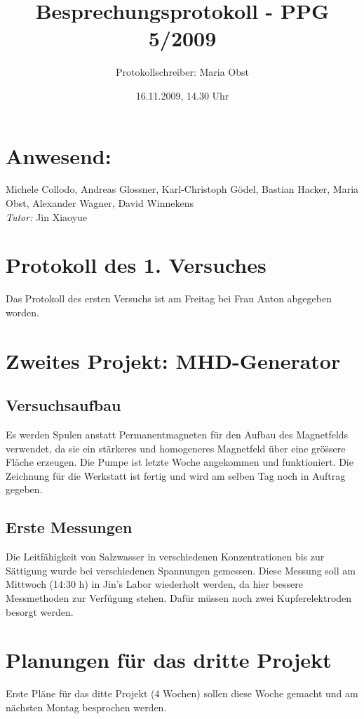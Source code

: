 \documentclass[11pt]{scrartcl}
\title{Besprechungsprotokoll - PPG 5/2009}
\date{16.11.2009, 14.30 Uhr}
\author{Protokollschreiber: Maria Obst}
\begin{document}
\maketitle
\pagestyle{empty}
\section{Anwesend:} Michele Collodo, Andreas Glossner, Karl-Christoph G\"odel, Bastian Hacker, Maria Obst, Alexander Wagner, David Winnekens \\ \emph{Tutor:} Jin Xiaoyue 


\section{Protokoll des 1. Versuches} 
Das Protokoll des ersten Versuchs ist am Freitag bei Frau Anton abgegeben worden.

\section{Zweites Projekt: MHD-Generator}
\subsection{Versuchsaufbau}
Es werden Spulen anstatt Permanentmagneten f\"ur den Aufbau des Magnetfelds verwendet, da sie ein st\"arkeres und homogeneres Magnetfeld \"uber eine gr\"o\"ss{}ere Fl\"ache erzeugen. Die Pumpe ist letzte Woche angekommen und funktioniert. Die Zeichnung f\"ur die Werkstatt ist fertig und wird am selben Tag noch in Auftrag gegeben.

\subsection{Erste Messungen}
Die Leitf\"ahigkeit von Salzwasser in verschiedenen Konzentrationen bis zur S\"attigung wurde bei verschiedenen Spannungen gemessen. Diese Messung soll am Mittwoch (14:30 h) in Jin's Labor wiederholt werden, da hier bessere Messmethoden zur Verf\"ugung stehen. Daf\"ur m\"ussen noch zwei Kupferelektroden besorgt werden.

\section{Planungen f\"ur das dritte Projekt}
Erste Pl\"ane f\"ur das ditte Projekt (4 Wochen) sollen diese Woche gemacht und am n\"achsten Montag besprochen werden.
\end{document}

